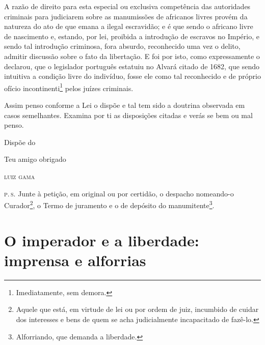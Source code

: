 A razão de direito para esta especial ou exclusiva competência das
autoridades criminais para judiciarem sobre as manumissões de africanos
livres provém da natureza do ato de que emana a ilegal escravidão; e é
que sendo o africano livre de nascimento e, estando, por lei, proibida a
introdução de escravos no Império, e sendo tal introdução criminosa,
fora absurdo, reconhecido uma vez o delito, admitir discussão sobre o
fato da libertação. E foi por isto, como expressamente o declarou, que o
legislador português estatuiu no Alvará citado de 1682, que sendo
intuitiva a condição livre do indivíduo, fosse ele como tal reconhecido
e de próprio ofício incontinenti\footnote{ Imediatamente, sem demora.}
pelos juízes criminais.

Assim penso conforme a Lei o dispõe e tal tem sido a doutrina observada
em casos semelhantes. Examina por ti as disposições citadas e verás se
bem ou mal penso.

\begin{flushright}
Dispõe do

Teu amigo obrigado

\textsc{luiz gama}
\end{flushright}

\textsc{p.\,s.} Junte à petição, em original ou por certidão, o despacho
nomeando-o Curador\footnote{ Aquele que está, em virtude de lei ou por
  ordem de juiz, incumbido de cuidar dos interesses e bens de quem se
  acha judicialmente incapacitado de fazê-lo.}, o Termo de juramento e o
de depósito do manumitente\footnote{ Alforriando, que demanda a
  liberdade.}.

\part{O imperador e a liberdade: imprensa e alforrias}

